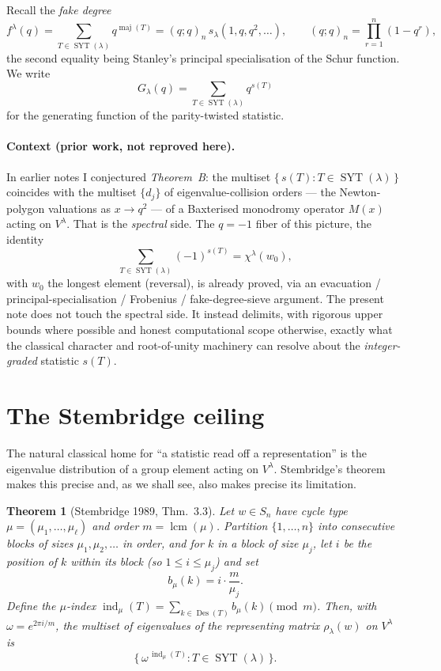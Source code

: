 \documentclass{article}
\newtheorem{theorem}{Theorem}
\theoremstyle{definition}
\theoremstyle{remark}
\newcommand{\SYT}{\operatorname{SYT}}
\newcommand{\Des}{\operatorname{Des}}
\newcommand{\maj}{\operatorname{maj}}
\newcommand{\ind}{\operatorname{ind}}
\newcommand{\lcm}{\operatorname{lcm}}
\begin{document}
Recall the \emph{fake degree}
\[
f^\lambda(q) = \sum_{T \in \SYT(\lambda)} q^{\maj(T)}
= (q;q)_n \, s_\lambda(1,q,q^2,\dots),
\qquad
(q;q)_n = \prod_{r=1}^{n} (1-q^r),
\]
the second equality being Stanley's principal specialisation of the Schur
function. We write
\[
G_\lambda(q) = \sum_{T \in \SYT(\lambda)} q^{s(T)}
\]
for the generating function of the parity-twisted statistic.

\paragraph{Context (prior work, not reproved here).}
In earlier notes I conjectured \emph{Theorem~B}: the multiset
$\{\, s(T) : T \in \SYT(\lambda)\,\}$ coincides with the multiset $\{d_j\}$ of
eigenvalue-collision orders --- the Newton-polygon valuations as $x \to q^2$ ---
of a Baxterised monodromy operator $M(x)$ acting on $V^\lambda$. That is the
\emph{spectral} side. The $q=-1$ fiber of this picture, the identity
\[
\sum_{T \in \SYT(\lambda)} (-1)^{s(T)} = \chi^\lambda(w_0),
\]
with $w_0$ the longest element (reversal), is already proved, via an evacuation /
principal-specialisation / Frobenius / fake-degree-sieve argument. The present
note does not touch the spectral side. It instead delimits, with rigorous upper
bounds where possible and honest computational scope otherwise, exactly what the
classical character and root-of-unity machinery can resolve about the
\emph{integer-graded} statistic $s(T)$.

\section{The Stembridge ceiling}

The natural classical home for ``a statistic read off a representation'' is the
eigenvalue distribution of a group element acting on $V^\lambda$. Stembridge's
theorem makes this precise and, as we shall see, also makes precise its
limitation.

\begin{theorem}[Stembridge 1989, Thm.~3.3]\label{thm:stembridge}
Let $w \in S_n$ have cycle type $\mu = (\mu_1,\dots,\mu_\ell)$ and order
$m = \lcm(\mu)$. Partition $\{1,\dots,n\}$ into consecutive blocks of sizes
$\mu_1, \mu_2, \dots$ in order, and for $k$ in a block of size $\mu_j$, let $i$ be
the position of $k$ within its block (so $1 \le i \le \mu_j$) and set
\[
b_\mu(k) = i \cdot \frac{m}{\mu_j}.
\]
Define the $\mu$-index $\ind_\mu(T) = \sum_{k \in \Des(T)} b_\mu(k) \pmod{m}$.
Then, with $\omega = e^{2\pi i / m}$, the multiset of eigenvalues of the
representing matrix $\rho_\lambda(w)$ on $V^\lambda$ is
\[
\bigl\{\, \omega^{\,\ind_\mu(T)} : T \in \SYT(\lambda) \,\bigr\}.
\]
\end{theorem}
\end{document}
